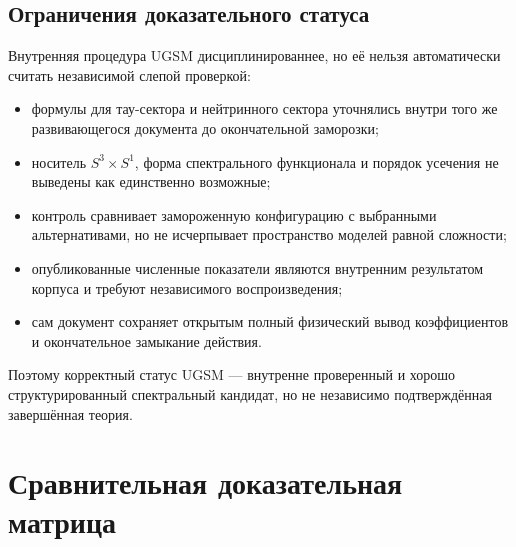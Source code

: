 \documentclass[12pt,a4paper]{article}
\begin{document}
\subsection{Ограничения доказательного статуса}

Внутренняя процедура UGSM дисциплинированнее, но её нельзя автоматически
считать независимой слепой проверкой:
\begin{itemize}
    \item формулы для тау-сектора и нейтринного сектора уточнялись внутри того
    же развивающегося документа до окончательной заморозки;
    \item носитель $S^3\times S^1$, форма спектрального функционала и порядок
    усечения не выведены как единственно возможные;
    \item контроль сравнивает замороженную конфигурацию с выбранными
    альтернативами, но не исчерпывает пространство моделей равной сложности;
    \item опубликованные численные показатели являются внутренним результатом
    корпуса и требуют независимого воспроизведения;
    \item сам документ сохраняет открытым полный физический вывод коэффициентов
    и окончательное замыкание действия.
\end{itemize}

Поэтому корректный статус UGSM --- внутренне проверенный и хорошо
структурированный спектральный кандидат, но не независимо подтверждённая
завершённая теория.

\section{Сравнительная доказательная матрица}
\end{document}
